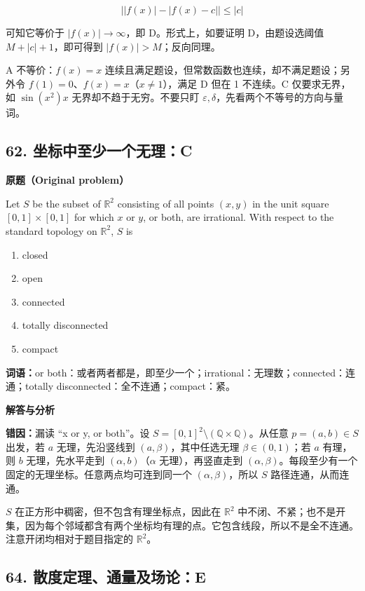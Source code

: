 \documentclass[11pt,a4paper,fontset=fandol]{ctexart}
\begin{document}
\[\bigl||f(x)|-|f(x)-c|\bigr|\le |c|\]

可知它等价于 \(|f(x)|\to\infty\)，即 D。形式上，如要证明 D，由题设选阈值
\(M+|c|+1\)，即可得到 \(|f(x)|>M\)；反向同理。

A 不等价：\(f(x)=x\)
连续且满足题设，但常数函数也连续，却不满足题设；另外令
\(f(1)=0\)、\(f(x)=x\)（\(x\ne1\)），满足 D 但在 1 不连续。C
仅要求无界，如 \(\sin(x^2)x\) 无界却不趋于无穷。不要只盯
\(\varepsilon,\delta\)，先看两个不等号的方向与量词。

\hypertarget{ux5750ux6807ux4e2dux81f3ux5c11ux4e00ux4e2aux65e0ux7406c}{%
\subsection{62.
坐标中至少一个无理：C}\label{ux5750ux6807ux4e2dux81f3ux5c11ux4e00ux4e2aux65e0ux7406c}}

\textbf{原题（Original problem）}\par
Let $S$ be the subset of $\mathbb R^2$ consisting of all points $(x,y)$ in the unit square $[0,1]\times[0,1]$ for which $x$ or $y$, or both, are irrational. With respect to the standard topology on $\mathbb R^2$, $S$ is
\begin{enumerate}[label=(\Alph*),nosep]
\item closed \item open \item connected \item totally disconnected \item compact
\end{enumerate}
\textbf{词语：}or both：或者两者都是，即至少一个；irrational：无理数；connected：连通；totally disconnected：全不连通；compact：紧。

\textbf{解答与分析}\par


\textbf{错因：}漏读 ``x or y, or both''。设
\(S=[0,1]^2\setminus(\mathbb Q\times\mathbb Q)\)。从任意
\(p=(a,b)\in S\) 出发，若 \(a\) 无理，先沿竖线到
\((a,\beta)\)，其中任选无理 \(\beta\in(0,1)\)；若 \(a\) 有理，则 \(b\)
无理，先水平走到 \((\alpha,b)\)（\(\alpha\) 无理），再竖直走到
\((\alpha,\beta)\)。每段至少有一个固定的无理坐标。任意两点均可连到同一个
\((\alpha,\beta)\)，所以 \(S\) 路径连通，从而连通。

\(S\) 在正方形中稠密，但不包含有理坐标点，因此在 \(\mathbb R^2\)
中不闭、不紧；也不是开集，因为每个邻域都含有两个坐标均有理的点。它包含线段，所以不是全不连通。注意开闭均相对于题目指定的
\(\mathbb R^2\)。

\hypertarget{ux6563ux5ea6ux5b9aux7406ux901aux91cfux53caux573aux8bbae}{%
\subsection{64.
散度定理、通量及场论：E}\label{ux6563ux5ea6ux5b9aux7406ux901aux91cfux53caux573aux8bbae}}
\end{document}
